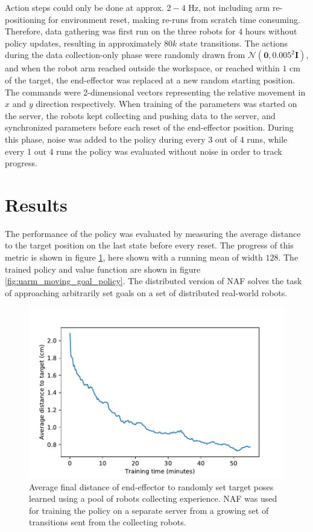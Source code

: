 Action steps could only be done at approx. $2-4$ Hz, not including arm
re-positioning for environment reset, making re-runs from scratch time
consuming. Therefore, data gathering was first run on the three robots for $4$
hours without policy updates, resulting in approximately $80k$ state
transitions. The actions during the data collection-only phase were randomly
drawn from $\mathcal{N}(\mathbf{0}, 0.005^2 \mathbf{I})$, and when the robot
arm reached outside the workspace, or reached within $1$ cm of the target, the
end-effector was replaced at a new random starting position. The commands were
2-dimensional vectors representing the relative movement in $x$ and $y$
direction respectively. When training of the parameters was started on the
server, the robots kept collecting and pushing data to the server, and
synchronized parameters before each reset of the end-effector position. During
this phase, noise was added to the policy during every 3 out of 4 runs, while
every 1 out 4 runs the policy was evaluated without noise in order to track
progress.

\section{Results}

The performance of the policy was evaluated by measuring the average distance
to the target position on the last state before every reset. The progress of
this metric is shown in figure \ref{fig:uarm_moving_goal_progress}, here shown
with a running mean of width $128$. The trained policy and value function are
shown in figure \ref{fig:uarm_moving_goal_policy}. The distributed version of
NAF solves the task of approaching arbitrarily set goals on a set of
distributed real-world robots.

\begin{figure}[h!]
    \centering
    \includegraphics[width=0.50 \textwidth]{res/uarm_moving_goal_progress.pdf}

    \caption{Average final distance of end-effector to randomly set target
    poses learned using a pool of robots collecting experience. NAF was used
    for training the policy on a separate server from a growing set of
    transitions sent from the collecting robots.}
    \label{fig:uarm_moving_goal_progress}
    
\end{figure}

